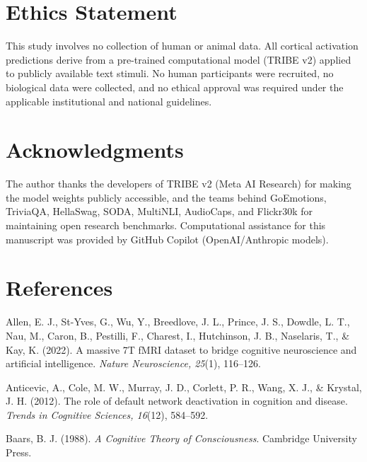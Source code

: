 \documentclass[11pt,letterpaper]{article}
\numberwithin{equation}{section}
\begin{document}
\section*{Ethics Statement}

This study involves no collection of human or animal data. All cortical activation predictions derive from a pre-trained computational model (TRIBE v2) applied to publicly available text stimuli. No human participants were recruited, no biological data were collected, and no ethical approval was required under the applicable institutional and national guidelines.

\section*{Acknowledgments}

The author thanks the developers of TRIBE v2 (Meta AI Research) for making the model weights publicly accessible, and the teams behind GoEmotions, TriviaQA, HellaSwag, SODA, MultiNLI, AudioCaps, and Flickr30k for maintaining open research benchmarks. Computational assistance for this manuscript was provided by GitHub Copilot (OpenAI/Anthropic models).

\FloatBarrier
\clearpage
\section*{References}

\small
\setlength{\parindent}{0pt}
\setlength{\parskip}{4pt}

Allen, E. J., St-Yves, G., Wu, Y., Breedlove, J. L., Prince, J. S., Dowdle, L. T., Nau, M., Caron, B., Pestilli, F., Charest, I., Hutchinson, J. B., Naselaris, T., \& Kay, K. (2022). A massive 7T fMRI dataset to bridge cognitive neuroscience and artificial intelligence. \textit{Nature Neuroscience, 25}(1), 116--126.

Anticevic, A., Cole, M. W., Murray, J. D., Corlett, P. R., Wang, X. J., \& Krystal, J. H. (2012). The role of default network deactivation in cognition and disease. \textit{Trends in Cognitive Sciences, 16}(12), 584--592.

Baars, B. J. (1988). \textit{A Cognitive Theory of Consciousness}. Cambridge University Press.
\end{document}
